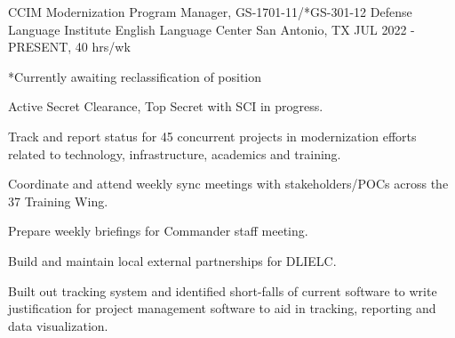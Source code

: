 


\begin{cventries}

\cventry
{CCIM Modernization Program Manager, GS-1701-11/*GS-301-12} %
{Defense Language Institute English Language Center} %
{San Antonio, TX} %
{JUL 2022 - PRESENT, 40 hrs/wk} %
{ %
\begin{cvitems}
\item {*Currently awaiting reclassification of position}
\item {Active Secret Clearance, Top Secret with SCI in progress.}
\item {Track and report status for 45 concurrent projects in modernization efforts related to technology, infrastructure, academics and training.}
\item {Coordinate and attend weekly sync meetings with stakeholders/POCs across the 37 Training Wing.}
\item {Prepare weekly briefings for Commander staff meeting.}
\item {Build and maintain local external partnerships for DLIELC.}
\item {Built out tracking system and identified short-falls of current software to write justification for project management software to aid in tracking, reporting and data visualization.} 
\end{cvitems}
}


\end{cventries}
